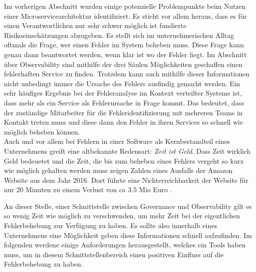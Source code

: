 \documentclass[
	12pt,
	BCOR=5mm,
	DIV=12,
	headinclude=on,
	footinclude=off,
	parskip=half,
	bibliography=totoc,
	listof=entryprefix,
	toc=listof,
	numbers=noenddot,
	plainfootsepline
]{scrreprt}
\begin{document}
Im vorherigen Abschnitt wurden einige potenzielle Problempunkte beim Nutzen einer Microservicearchitektur identifiziert. Es sticht vor allem heraus, dass es für einen Verantwortlichen nur sehr schwer möglich ist fundierte Risikoeinschätzungen abzugeben. Es stellt sich im unternehmerischen Alltag oftmals die Frage, wer einen Fehler im System beheben muss. Diese Frage kann genau dann beantwortet werden, wenn klar ist wo der Fehler liegt. Im Abschnitt über Observability sind mithilfe der drei Säulen Möglichkeiten geschaffen einen fehlerhaften Service zu finden. Trotzdem kann auch mithilfe dieser Informationen nicht unbedingt immer die Ursache des Fehlers ausfindig gemacht werden. Ein sehr häufiges Ergebnis bei der Fehleranalyse im Kontext verteilter Systeme ist, dass mehr als ein Service als Fehlerursache in Frage kommt. Das bedeutet, dass der zuständige Mitarbeiter für die Fehleridentifizierung mit mehreren Teams in Kontakt treten muss und diese dann den Fehler in ihren Services so schnell wie möglich beheben können. \\
Auch und vor allem bei Fehlern in einer Software als Kernbestandteil eines Unternehmens greift eine altbekannte Redensart: \textit{Zeit ist Geld}. Dass Zeit wirklich Geld bedeuetet und die Zeit, die bis zum beheben eines Fehlers vergeht so kurz wie möglich gehalten werden muss zeigen Zahlen eines Ausfalls der Amazon Website aus dem Jahr 2016. Dort führte eine Nichterreichbarkeit der Website für nur 20 Minuten zu einem Verlust von ca 3.5 Mio Euro .

An dieser Stelle, einer Schnittstelle zwischen Governance und Observability gilt es so wenig Zeit wie möglich zu verschwenden, um mehr Zeit bei der eigentlichen Fehlerbehebung zur Verfügung zu haben. Es sollte also innerhalb eines Unternehmens eine Möglichkeit geben diese Informationen schnell aufzufinden. Im folgenden werdene einige Anforderungen herausgestellt, welches ein Tools haben muss, um in diesem Schnittstellenbereich einen positiven Einfluss auf die Fehlerbehebung zu haben.

\end{document}
